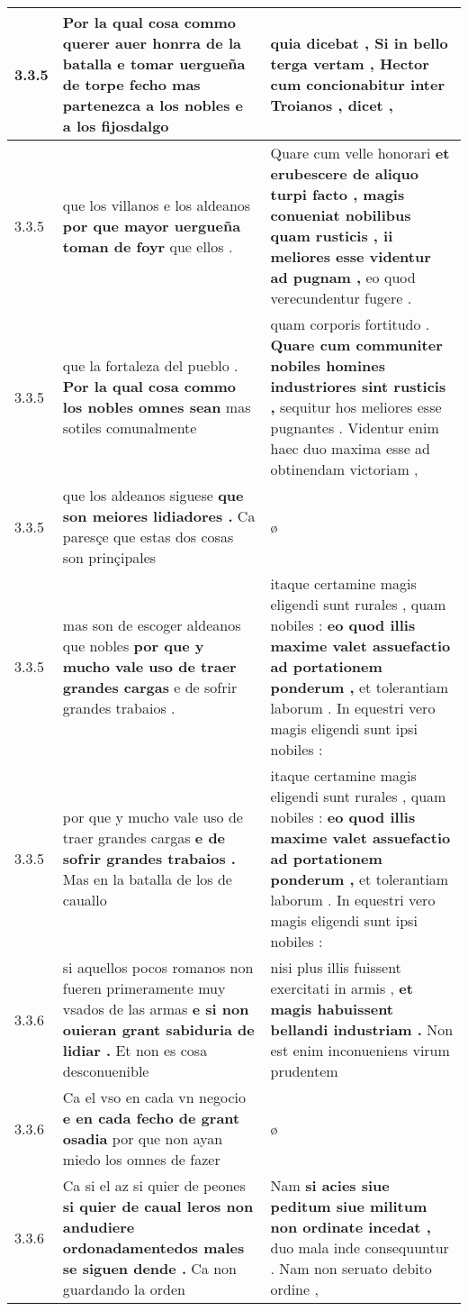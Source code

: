 \begin{tabular}{|p{1cm}|p{6.5cm}|p{6.5cm}|}
3.3.5 & Por la qual cosa commo querer auer honrra de la batalla \textbf{ e tomar uergueña de torpe fecho } mas partenezca a los nobles e a los fijosdalgo & quia dicebat , \textbf{ Si in bello terga vertam , Hector cum concionabitur } inter Troianos , dicet , \\\hline
3.3.5 & que los villanos e los aldeanos \textbf{ por que mayor uergueña toman de foyr } que ellos . & Quare cum velle honorari \textbf{ et erubescere de aliquo turpi facto , magis conueniat nobilibus quam rusticis , ii meliores esse videntur ad pugnam , } eo quod verecundentur fugere . \\\hline
3.3.5 & que la fortaleza del pueblo . \textbf{ Por la qual cosa commo los nobles omnes sean } mas sotiles comunalmente & quam corporis fortitudo . \textbf{ Quare cum communiter nobiles homines industriores sint rusticis , } sequitur hos meliores esse pugnantes . Videntur enim haec duo maxima esse ad obtinendam victoriam , \\\hline
3.3.5 & que los aldeanos siguese \textbf{ que son meiores lidiadores . } Ca paresçe que estas dos cosas son prinçipales & ø \\\hline
3.3.5 & mas son de escoger aldeanos que nobles \textbf{ por que y mucho vale uso de traer grandes cargas } e de sofrir grandes trabaios . & itaque certamine magis eligendi sunt rurales , quam nobiles : \textbf{ eo quod illis maxime valet assuefactio ad portationem ponderum , } et tolerantiam laborum . In equestri vero magis eligendi sunt ipsi nobiles : \\\hline
3.3.5 & por que y mucho vale uso de traer grandes cargas \textbf{ e de sofrir grandes trabaios . } Mas en la batalla de los de cauallo & itaque certamine magis eligendi sunt rurales , quam nobiles : \textbf{ eo quod illis maxime valet assuefactio ad portationem ponderum , } et tolerantiam laborum . In equestri vero magis eligendi sunt ipsi nobiles : \\\hline
3.3.6 & si aquellos pocos romanos non fueren primeramente muy vsados de las armas \textbf{ e si non ouieran grant sabiduria de lidiar . } Et non es cosa desconuenible & nisi plus illis fuissent exercitati in armis , \textbf{ et magis habuissent bellandi industriam . } Non est enim inconueniens virum prudentem \\\hline
3.3.6 & Ca el vso en cada vn negocio \textbf{ e en cada fecho de grant osadia } por que non ayan miedo los omnes de fazer & ø \\\hline
3.3.6 & Ca si el az si quier de peones \textbf{ si quier de caual leros non andudiere ordonadamentedos males se siguen dende . } Ca non guardando la orden & Nam \textbf{ si acies siue peditum siue militum non ordinate incedat , } duo mala inde consequuntur . Nam non seruato debito ordine , \\\hline

\end{tabular}
